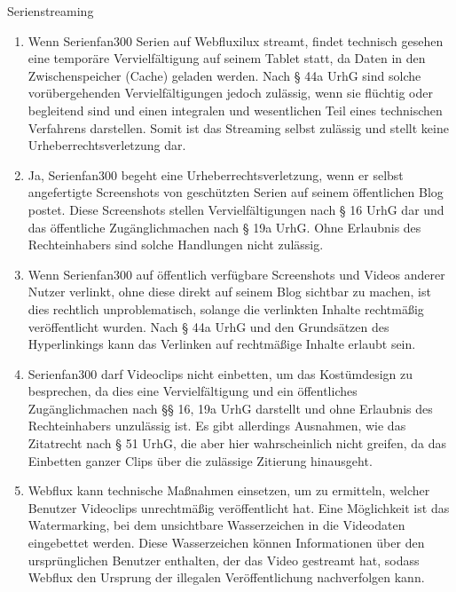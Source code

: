 \documentclass{article}
\begin{document}
\begin{exercise}{Serienstreaming}
  \begin{solution}
    \begin{enumerate}
      \item Wenn Serienfan300 Serien auf Webfluxilux streamt, findet technisch gesehen eine temporäre Vervielfältigung auf seinem Tablet statt, da Daten in den Zwischenspeicher (Cache) geladen werden. Nach § 44a UrhG sind solche vorübergehenden Vervielfältigungen jedoch zulässig, wenn sie flüchtig oder begleitend sind und einen integralen und wesentlichen Teil eines technischen Verfahrens darstellen. Somit ist das Streaming selbst zulässig und stellt keine Urheberrechtsverletzung dar.
      \item Ja, Serienfan300 begeht eine Urheberrechtsverletzung, wenn er selbst angefertigte Screenshots von geschützten Serien auf seinem öffentlichen Blog postet. Diese Screenshots stellen Vervielfältigungen nach § 16 UrhG dar und das öffentliche Zugänglichmachen nach § 19a UrhG. Ohne Erlaubnis des Rechteinhabers sind solche Handlungen nicht zulässig.
      \item Wenn Serienfan300 auf öffentlich verfügbare Screenshots und Videos anderer Nutzer verlinkt, ohne diese direkt auf seinem Blog sichtbar zu machen, ist dies rechtlich unproblematisch, solange die verlinkten Inhalte rechtmäßig veröffentlicht wurden. Nach § 44a UrhG und den Grundsätzen des Hyperlinkings kann das Verlinken auf rechtmäßige Inhalte erlaubt sein.
      \item Serienfan300 darf Videoclips nicht einbetten, um das Kostümdesign zu besprechen, da dies eine Vervielfältigung und ein öffentliches Zugänglichmachen nach §§ 16, 19a UrhG darstellt und ohne Erlaubnis des Rechteinhabers unzulässig ist. Es gibt allerdings Ausnahmen, wie das Zitatrecht nach § 51 UrhG, die aber hier wahrscheinlich nicht greifen, da das Einbetten ganzer Clips über die zulässige Zitierung hinausgeht.
      \item Webflux kann technische Maßnahmen einsetzen, um zu ermitteln, welcher Benutzer Videoclips unrechtmäßig veröffentlicht hat. Eine Möglichkeit ist das Watermarking, bei dem unsichtbare Wasserzeichen in die Videodaten eingebettet werden. Diese Wasserzeichen können Informationen über den ursprünglichen Benutzer enthalten, der das Video gestreamt hat, sodass Webflux den Ursprung der illegalen Veröffentlichung nachverfolgen kann.
    \end{enumerate}
  \end{solution}
\end{exercise}
\end{document}
